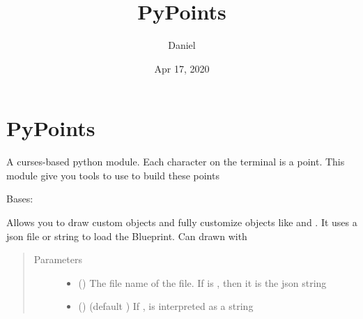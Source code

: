 \documentclass[letterpaper,10pt,english]{sphinxmanual}
\title{PyPoints}
\date{Apr 17, 2020}
\author{Daniel}
\begin{document}
\pagestyle{empty}
\sphinxmaketitle
\pagestyle{plain}
\sphinxtableofcontents
\pagestyle{normal}
\label{\detokenize{index::doc}}



\chapter{PyPoints}
\label{\detokenize{pypoints:module-pypoints}}\label{\detokenize{pypoints:pypoints}}\label{\detokenize{pypoints::doc}}
A curses-based python module. Each character on the terminal is a point.
This module give you tools to use to build these points

\begin{fulllineitems}
\label{\detokenize{pypoints:pypoints.Blueprint}}
Bases: 

Allows you to draw custom objects and fully customize objects like {\hyperref[\detokenize{pypoints:pypoints.MenuBox}]{}} and {\hyperref[\detokenize{pypoints:pypoints.Text}]{}}. It uses a json file or string to load the Blueprint. Can drawn with {\hyperref[\detokenize{pypoints:pypoints.Shape}]{}}
\begin{quote}\begin{description}
\item[{Parameters}] \leavevmode\begin{itemize}
\item {} 
 () \textendash{} The file name of the file. If  is , then it is the json string

\item {} 
 () \textendash{} (default ) If ,  is interpreted as a string

\end{itemize}

\end{description}\end{quote}

\end{fulllineitems}
\end{document}
